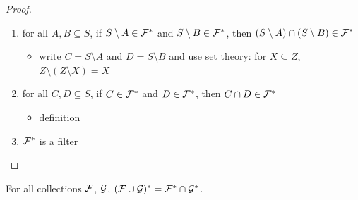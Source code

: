 \begin{proof}
\begin{enumerate}
        \item for all $A, B \subseteq S$, if $S \setminus A \in \mathcal{F}^*$ and $S \setminus B \in \mathcal{F}^*$, then $(S \setminus A) \cap (S \setminus B) \in \mathcal{F}^*$
        \begin{itemize}
            \item[--] write $C = S \setminus A$ and $D = S \setminus B$ and use set theory: for $X \subseteq Z$, $Z \setminus (Z \setminus X) = X$
        \end{itemize}

        \item for all $C, D \subseteq S$, if $C \in \mathcal{F}^*$ and $D \in \mathcal{F}^*$, then $C \cap D \in \mathcal{F}^*$
        \begin{itemize}
            \item[--] definition
        \end{itemize}

        \item $\mathcal{F}^*$ is a filter
    \end{enumerate}
\end{proof}



\begin{theorem}
    \label{thm_de_morgan_union_v1}
    \leanok{}
    For all collections $\mathcal{F}$, $\mathcal{G}$, $(\mathcal{F} \cup \mathcal{G})^* = \mathcal{F}^* \cap \mathcal{G}^*$.
\end{theorem}

